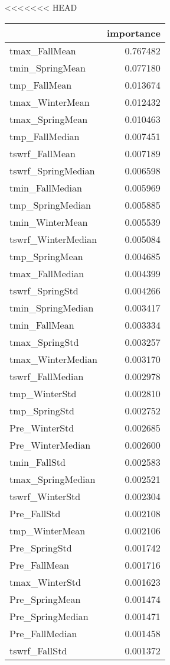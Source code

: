 <<<<<<< HEAD
\begin{tabular}{lr}
\toprule
 & importance \\
\midrule
tmax_FallMean & 0.767482 \\
tmin_SpringMean & 0.077180 \\
tmp_FallMean & 0.013674 \\
tmax_WinterMean & 0.012432 \\
tmax_SpringMean & 0.010463 \\
tmp_FallMedian & 0.007451 \\
tswrf_FallMean & 0.007189 \\
tswrf_SpringMedian & 0.006598 \\
tmin_FallMedian & 0.005969 \\
tmp_SpringMedian & 0.005885 \\
tmin_WinterMean & 0.005539 \\
tswrf_WinterMedian & 0.005084 \\
tmp_SpringMean & 0.004685 \\
tmax_FallMedian & 0.004399 \\
tswrf_SpringStd & 0.004266 \\
tmin_SpringMedian & 0.003417 \\
tmin_FallMean & 0.003334 \\
tmax_SpringStd & 0.003257 \\
tmax_WinterMedian & 0.003170 \\
tswrf_FallMedian & 0.002978 \\
tmp_WinterStd & 0.002810 \\
tmp_SpringStd & 0.002752 \\
Pre_WinterStd & 0.002685 \\
Pre_WinterMedian & 0.002600 \\
tmin_FallStd & 0.002583 \\
tmax_SpringMedian & 0.002521 \\
tswrf_WinterStd & 0.002304 \\
Pre_FallStd & 0.002108 \\
tmp_WinterMean & 0.002106 \\
Pre_SpringStd & 0.001742 \\
Pre_FallMean & 0.001716 \\
tmax_WinterStd & 0.001623 \\
Pre_SpringMean & 0.001474 \\
Pre_SpringMedian & 0.001471 \\
Pre_FallMedian & 0.001458 \\
tswrf_FallStd & 0.001372 \\

\end{tabular}
